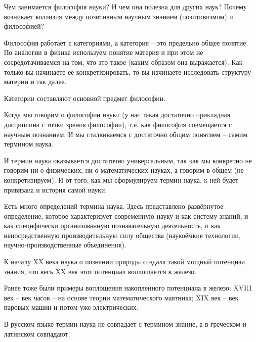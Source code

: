 \documentclass[main.tex]{subfiles}
\begin{document}




Чем занимается философия науки?
И чем она полезна для других наук?
Почему возникает коллизия между позитивным научным знанием (позитивизмом) и философией?




Философия работает с категориями, а категория -- это предельно общее понятие.
По аналогии в физике используем понятие материя и при этом не сосредотачиваемся на том, что это такое (каким образом она выражается).
Как только вы начинаете её конкретизировать, то вы начинаете исследовать структуру материи и так далее.

Категории составляют основной предмет философии.

Когда мы говорим о философии науки (у нас такая достаточно прикладная дисциплина с точки зрения философии), т.е. как философия совмещается с научным познанием.
И мы сталкиваемся с достаточно общим понятием -- самим термином наука.

И термин наука оказывается достаточно универсальным, так как мы конкретно не говорим ни о физических, ни о математических науках, а говорим в общем (не конкретизируем).
И от того, как мы сформулируем термин наука, к ней будет привязана и история самой науки.

Есть много определений термина наука.
Здесь представлено развёрнутое определение, которое характеризует современную науку и как систему знаний, и как специфически организованную познавательную деятельность, и как непосредственную производительную силу общества (наукоёмкие технологии, научно-производственные объединения).

К началу XX века наука о познании природы создала такой мощный потенциал знания, что весь XX век этот потенциал воплощается в железо.

Ранее тоже были примеры воплощения накопленного потенциала в железо: XVIII век -- век часов -- на основе теории математического маятника; XIX век -- век паровых машин и потом уже электрических.

В русском языке термин наука не совпадает с термином знание, а в греческом и латинском совпадают.
\end{document}
